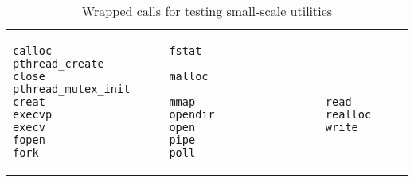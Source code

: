 
\begin{table}
\begin{tabular}{l}
\begin{lstlisting}
calloc                  fstat                   pthread_create
close                   malloc                  pthread_mutex_init
creat                   mmap                    read
execvp                  opendir                 realloc
execv                   open                    write
fopen                   pipe
fork                    poll
\end{lstlisting}
\end{tabular}
\caption{Wrapped calls for testing small-scale utilities}
\label{lst:small_scale_wrappers}
\end{table}
